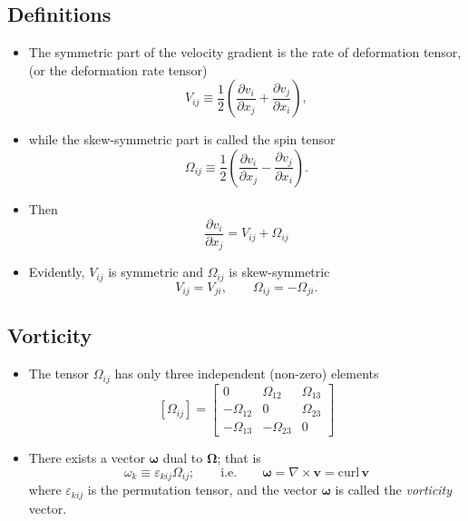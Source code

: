 \documentclass[11pt]{article}
\begin{document}
\subsection*{Definitions}
\label{sec:org7dbee8c}
\begin{itemize}
\item The symmetric part of the velocity gradient is the rate of deformation tensor, (or the deformation rate tensor)
$$ V_{ij} \equiv  \frac{1}{2} \left( \frac{\partial v_i}{\partial x_j} + \frac{\partial v_j}{\partial x_i} \right), $$
\end{itemize}
\begin{itemize}
\item while the skew-symmetric part is called the spin tensor
$$ \Omega_{ij} \equiv \frac{1}{2} \left( \frac{\partial v_i}{\partial x_j} - \frac{\partial v_j}{\partial x_i} \right). $$
\item Then
$$ \frac{\partial v_i}{\partial x_j} = V_{ij} + \Omega_{ij} $$
\item Evidently, \(V_{ij}\) is symmetric and \(\Omega_{ij}\) is skew-symmetric
$$ V_{ij} = V_{ji}, \hspace{2em} \Omega_{ij} = -\Omega_{ji}. $$
\end{itemize}
\subsection*{Vorticity}
\label{sec:org46ba111}
\begin{itemize}
\item The tensor \(\Omega_{ij}\) has only three independent (non-zero) elements
$$ [\Omega_{ij}] = \begin{bmatrix} 0 & \Omega_{12} & \Omega_{13} \\ -\Omega_{12} & 0 & \Omega_{23} \\ -\Omega_{13} & -\Omega_{23} & 0 \end{bmatrix} $$
\end{itemize}
\begin{itemize}
\item There exists a vector \(\boldsymbol{\omega}\) dual to \(\boldsymbol{\Omega}\); that is
$$ \omega_k \equiv \varepsilon_{kij} \Omega_{ij}; \hspace{2em} \mathrm{i.e.} \hspace{2em} \boldsymbol{\omega} = \nabla \times \boldsymbol{v} = \mathrm{curl}\,\boldsymbol{v} $$
where \(\varepsilon_{kij}\) is the permutation tensor, and the vector \(\boldsymbol{\omega}\) is called the \emph{vorticity} vector.
\end{itemize}
\end{document}

